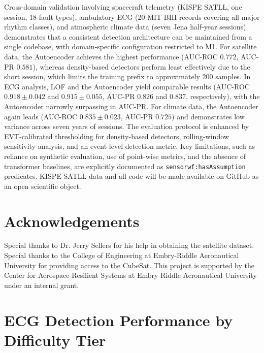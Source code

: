 \documentclass[conference]{IEEEtran}
\begin{document}
Cross-domain validation involving spacecraft telemetry (KISPE SATLL, one session, 18 fault types), ambulatory ECG (20 MIT-BIH records covering all major rhythm classes), and atmospheric climate data (seven Jena half-year sessions) demonstrates that a consistent detection architecture can be maintained from a single codebase, with domain-specific configuration restricted to M1. For satellite data, the Autoencoder achieves the highest performance (AUC-ROC $0.772$, AUC-PR $0.581$), whereas density-based detectors perform least effectively due to the short session, which limits the training prefix to approximately 200 samples. In ECG analysis, LOF and the Autoencoder yield comparable results (AUC-ROC $0.918\pm0.042$ and $0.915\pm0.055$, AUC-PR $0.826$ and $0.837$, respectively), with the Autoencoder narrowly surpassing in AUC-PR. For climate data, the Autoencoder again leads (AUC-ROC $0.835\pm0.023$, AUC-PR $0.725$) and demonstrates low variance across seven years of sessions. The evaluation protocol is enhanced by EVT-calibrated thresholding for density-based detectors, rolling-window sensitivity analysis, and an event-level detection metric. Key limitations, such as reliance on synthetic evaluation, use of point-wise metrics, and the absence of transformer baselines, are explicitly documented as \texttt{sensorwf:hasAssumption} predicates. KISPE SATLL data and all code will be made available on GitHub as an open scientific object.

\section{Acknowledgements}

Special thanks to Dr. Jerry Sellers for his help in obtaining the satellite dataset. Special thanks to the College of Engineering at Embry-Riddle Aeronautical University for providing access to the CubeSat.
This project is supported by the Center for Aerospace Resilient Systems at Embry-Riddle Aeronautical University under an internal grant.




\appendices

\section{ECG Detection Performance by Difficulty Tier}
\label{app:tier}
\end{document}
